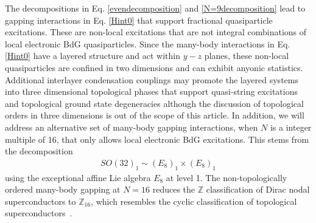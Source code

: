 The decompositions in Eq. \eqref{evendecomposition} and \eqref{N=9decomposition} lead to gapping interactions in Eq. \eqref{Hint0} that support fractional quasiparticle excitations. These are non-local excitations that are not integral combinations of local electronic BdG quasiparticles. Since the many-body interactions in Eq. \eqref{Hint0} have a layered structure and act within $y-z$ planes, these non-local quasiparticles are confined in two dimensions and can exhibit anyonic statistics. Additional interlayer condensation couplings may promote the layered systems into three dimensional topological phases that support quasi-string excitations and topological ground state degeneracies although the discussion of topological orders in three dimensions is out of the scope of this article. In addition, we will address an alternative set of many-body gapping interactions, when $N$ is a integer multiple of 16, that only allows local electronic BdG excitations. This stems from the decomposition \begin{align}SO(32)_1\sim(E_8)_1\times(E_8)_1\end{align} using the exceptional affine Lie algebra $E_8$ at level 1. The non-topologically ordered many-body gapping at $N=16$ reduces the $\mathbb{Z}$ classification of Dirac nodal superconductors to $\mathbb{Z}_{16}$, which resembles the cyclic classification of topological superconductors~\cite{LukaszChenVishwanath,MetlitskiFidkowskiChenVishwanath14}.



